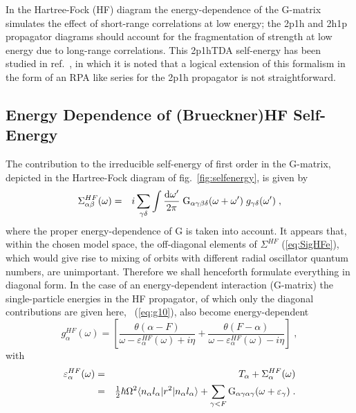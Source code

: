 In the Hartree-Fock (HF)
 diagram the energy-dependence of the  G-matrix simulates the effect 
of short-range correlations at low energy; the 2p1h and 2h1p propagator 
diagrams should 
account for the fragmentation of strength at low energy due to 
long-range correlations. This 2p1hTDA self-energy has been studied in 
ref.~\cite{RGAD95}, in which it is noted that a logical extension of this 
formalism in the form of an RPA like series for the 2p1h propagator is not
straightforward.

\subsection{Energy Dependence of (Brueckner)HF Self-Energy}
The contribution to the irreducible self-energy of first order in the G-matrix,
depicted in the Hartree-Fock diagram of fig.~\ref{fig:selfenergy}, is 
given by 
%
	\begin{eqnarray}
		\Sigma^{HF}_{\alpha\beta}(\omega)
	&=&
		i
		\sum_{\gamma\delta}
		\int \frac{{\rm d}\omega' }{ 2\pi }
	\;
		{\rm G}_{\alpha\gamma\beta\delta}( \omega+\omega' )
	\;
		g_{\gamma\delta}( \omega' )
	\label{eq:SigHFe}
	\;,
	\end{eqnarray}
%
where the proper energy-dependence of G is taken into account.
It appears that, within the chosen model space, the off-diagonal elements of 
$\Sigma^{HF}$ (\ref{eq:SigHFe}), which would give rise to mixing of orbits 
with different radial oscillator quantum numbers, are unimportant. Therefore 
we shall henceforth formulate everything in diagonal form.
In the case of an energy-dependent interaction (G-matrix)
the single-particle energies in the HF propagator,
of which only the diagonal contributions are given here,
\cf\ (\ref{eq:g10}), also become energy-dependent
%
	\begin{equation}
		g^{HF}_{\alpha}(\omega)
	=
		\left[
		\frac{
			\theta( \alpha - F )
		}{ \omega - \varepsilon^{HF}_\alpha(\omega) +i \eta }
	+
		\frac{
			\theta(  F - \alpha )
		}{ \omega - \varepsilon^{HF}_\alpha(\omega) -i \eta }
		\right]
	\label{eqbis:gHF}
	\;,
	\end{equation}
%
with
%
	\begin{eqnarray}
		\varepsilon^{HF}_\alpha(\omega)
	&=&
			T_{\alpha}
			+
			\Sigma^{HF}_{\alpha}(\omega)
	\nonumber \\
	&=&
			\half \hbar \Omega^2
			\ME< n_\alpha l_\alpha | r^2 | n_\alpha l_\alpha >
			+
			\sum_{\gamma < F}
			{\rm G}_{\alpha\gamma\alpha\gamma}
			(\omega+\varepsilon_\gamma)
	\label{eq:eHFom}
	\;.
	\end{eqnarray}
